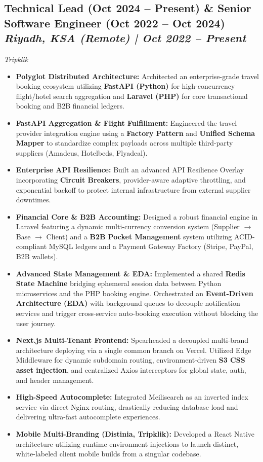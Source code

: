 \documentclass[11pt, a4paper]{article}
\newcommand{\entryheader}[4]{%
  \subsection*{\textbf{\color{accent}#1} \hfill \textcolor{secondary}{\textit{#3 | #4}}}
  \vspace{-0.5ex}
  {\color{secondary}\textit{#2}}
  \vspace{0.5ex}
}
\begin{document}
\entryheader{Technical Lead (Oct 2024 -- Present) \& Senior Software Engineer (Oct 2022 -- Oct 2024)}{Tripklik}{Riyadh, KSA (Remote)}{Oct 2022 – Present}
\begin{itemize}
    \item \textbf{Polyglot Distributed Architecture:} Architected an enterprise-grade travel booking ecosystem utilizing \textbf{FastAPI (Python)} for high-concurrency flight/hotel search aggregation and \textbf{Laravel (PHP)} for core transactional booking and B2B financial ledgers.
    \item \textbf{FastAPI Aggregation \& Flight Fulfillment:} Engineered the travel provider integration engine using a \textbf{Factory Pattern} and \textbf{Unified Schema Mapper} to standardize complex payloads across multiple third-party suppliers (Amadeus, Hotelbeds, Flyadeal).
    \item \textbf{Enterprise API Resilience:} Built an advanced API Resilience Overlay incorporating \textbf{Circuit Breakers}, provider-aware adaptive throttling, and exponential backoff to protect internal infrastructure from external supplier downtimes.
    \item \textbf{Financial Core \& B2B Accounting:} Designed a robust financial engine in Laravel featuring a dynamic multi-currency conversion system (Supplier $\rightarrow$ Base $\rightarrow$ Client) and a \textbf{B2B Pocket Management} system utilizing ACID-compliant MySQL ledgers and a Payment Gateway Factory (Stripe, PayPal, B2B wallets).
    \item \textbf{Advanced State Management \& EDA:} Implemented a shared \textbf{Redis State Machine} bridging ephemeral session data between Python microservices and the PHP booking engine. Orchestrated an \textbf{Event-Driven Architecture (EDA)} with background queues to decouple notification services and trigger cross-service auto-booking execution without blocking the user journey.
    \item \textbf{Next.js Multi-Tenant Frontend:} Spearheaded a decoupled multi-brand architecture deploying via a single common branch on Vercel. Utilized Edge Middleware for dynamic subdomain routing, environment-driven \textbf{S3 CSS asset injection}, and centralized Axios interceptors for global state, auth, and header management.
    \item \textbf{High-Speed Autocomplete:} Integrated Meilisearch as an inverted index service via direct Nginx routing, drastically reducing database load and delivering ultra-fast autocomplete experiences.
    \item \textbf{Mobile Multi-Branding (Distinia, Tripklik):} Developed a React Native architecture utilizing runtime environment injections to launch distinct, white-labeled client mobile builds from a singular codebase.
\end{itemize}
\end{document}
